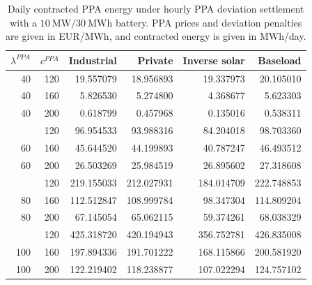 \begin{table}[p]
\centering
\small
\caption{Daily contracted PPA energy under hourly PPA deviation settlement with a $10~\mathrm{MW}/30~\mathrm{MWh}$ battery. PPA prices and deviation penalties are given in EUR/MWh, and contracted energy is given in MWh/day.}
\label{tab:contracted-energy-hourly-p-10-e-30}
\begin{tabular*}{\textwidth}{@{\extracolsep{\fill}}rrrrrr@{}}
\toprule
$\lambda^{PPA}$ & $c^{PPA}$ & Industrial & Private & Inverse solar & Baseload \\
\midrule
40 & 120 & 19.557079 & 18.956893 & 19.337973 & 20.105010 \\
40 & 160 & 5.826530 & 5.274800 & 4.368677 & 5.623303 \\
40 & 200 & 0.618799 & 0.457968 & 0.135016 & 0.538311 \\
\addlinespace
60 & 120 & 96.954533 & 93.988316 & 84.204018 & 98.703360 \\
60 & 160 & 45.644520 & 44.199893 & 40.787247 & 46.493512 \\
60 & 200 & 26.503269 & 25.984519 & 26.895602 & 27.318608 \\
\addlinespace
80 & 120 & 219.155033 & 212.027931 & 184.014709 & 222.748853 \\
80 & 160 & 112.512847 & 108.999784 & 98.347304 & 114.809204 \\
80 & 200 & 67.145054 & 65.062115 & 59.374261 & 68.038329 \\
\addlinespace
100 & 120 & 425.318720 & 420.194943 & 356.752781 & 426.835008 \\
100 & 160 & 197.894336 & 191.701222 & 168.115866 & 200.581920 \\
100 & 200 & 122.219402 & 118.238877 & 107.022294 & 124.757102 \\
\bottomrule
\end{tabular*}
\end{table}


